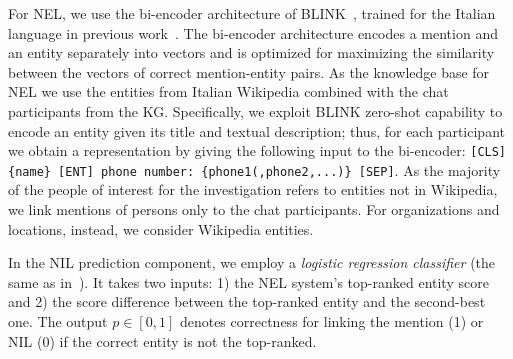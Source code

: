 For NEL, we use the bi-encoder architecture of BLINK~\cite{blink}, trained for the Italian language in previous work~\cite{aixia_2023}. The bi-encoder architecture encodes a mention and an entity separately into vectors and is optimized for maximizing the similarity between the vectors of correct mention-entity pairs.
As the knowledge base for NEL we use the entities from Italian Wikipedia combined with the chat participants from the KG.
Specifically, we exploit BLINK zero-shot capability to encode an entity given its title and textual description; thus, for each participant we obtain a representation by giving the following input to the bi-encoder: \verb|[CLS] {name} [ENT] phone number: {phone1(,phone2,...)} [SEP]|. 
As the majority of the people of interest for the investigation refers to entities not in Wikipedia, we link mentions of persons only to the chat participants. For organizations and locations, instead, we consider Wikipedia entities.

In the NIL prediction component, we employ a \textit{logistic regression classifier} (the same as in~\cite{aixia_2023}).
It takes two inputs: 1) the NEL system's top-ranked entity score and 2) the score difference between the top-ranked entity and the second-best one. %
The output $p \in [0,1]$ denotes correctness for linking the mention (1) or NIL (0) if the correct entity is not the top-ranked.




